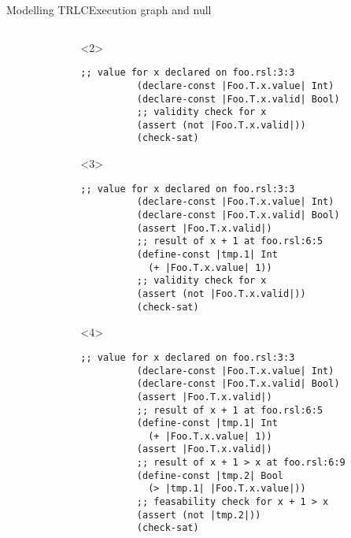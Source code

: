 \documentclass[aspectratio=169]{beamer}
\begin{document}
\begin{frame}[fragile]{Modelling TRLC}{Execution graph and null}
\begin{columns}
\begin{column}{0.5\textwidth}
\begin{center}
      \end{center}
    \end{column}
    \begin{column}{0.5\textwidth}
      \begin{onlyenv}<2>
        \begin{lstlisting}[language=SMTLIB,gobble=10]
          ;; value for x declared on foo.rsl:3:3
          (declare-const |Foo.T.x.value| Int)
          (declare-const |Foo.T.x.valid| Bool)
          ;; validity check for x
          (assert (not |Foo.T.x.valid|))
          (check-sat)
        \end{lstlisting}
      \end{onlyenv}
      \begin{onlyenv}<3>
        \begin{lstlisting}[language=SMTLIB,gobble=10]
          ;; value for x declared on foo.rsl:3:3
          (declare-const |Foo.T.x.value| Int)
          (declare-const |Foo.T.x.valid| Bool)
          (assert |Foo.T.x.valid|)
          ;; result of x + 1 at foo.rsl:6:5
          (define-const |tmp.1| Int
            (+ |Foo.T.x.value| 1))
          ;; validity check for x
          (assert (not |Foo.T.x.valid|))
          (check-sat)
        \end{lstlisting}
      \end{onlyenv}
      \begin{onlyenv}<4>
        \begin{lstlisting}[language=SMTLIB,gobble=8]
          ;; value for x declared on foo.rsl:3:3
          (declare-const |Foo.T.x.value| Int)
          (declare-const |Foo.T.x.valid| Bool)
          (assert |Foo.T.x.valid|)
          ;; result of x + 1 at foo.rsl:6:5
          (define-const |tmp.1| Int
            (+ |Foo.T.x.value| 1))
          (assert |Foo.T.x.valid|)
          ;; result of x + 1 > x at foo.rsl:6:9
          (define-const |tmp.2| Bool
            (> |tmp.1| |Foo.T.x.value|))
          ;; feasability check for x + 1 > x
          (assert (not |tmp.2|))
          (check-sat)
        \end{lstlisting}
      \end{onlyenv}
    \end{column}
  \end{columns}
\end{frame}
\end{document}
